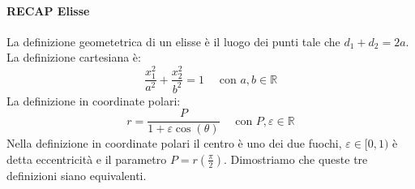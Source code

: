 \paragraph{RECAP Elisse}
La definizione geometetrica di un elisse è il luogo dei punti tale che $d_1+d_2= 2a$.
La definizione cartesiana è:
\begin{equation}
    \frac{x_1^2}{a^2}+ \frac{x_2^2}{b^2}=1 \quad \text{ con } a,b \in \mathbb{R}
\end{equation}
La definizione in coordinate polari:
\begin{equation}
    r = \frac{P}{1+\varepsilon\cos(\theta)} \quad \text{ con } P,\varepsilon \in \mathbb{R}
\end{equation}
Nella definizione in coordinate polari il centro è uno dei due fuochi, $\varepsilon \in [0,1)$ è detta eccentricità
e il parametro $P=r(\frac{\pi}{2})$.
Dimostriamo che queste tre definizioni siano equivalenti.
